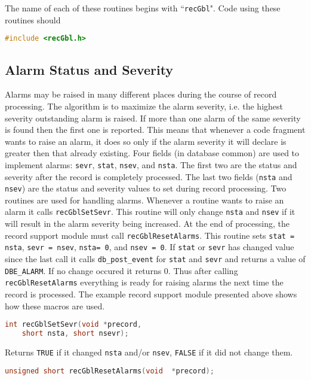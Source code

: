 The name of each of these routines begins with ``\verb|recGbl|".
Code using these routines should
\begin{lstlisting}[language=C]
#include <recGbl.h>
\end{lstlisting}

\subsection{Alarm Status and Severity}

Alarms may be raised in many different places during the course of record processing.
The algorithm is to maximize the alarm severity, i.e. the highest severity outstanding alarm is raised.
If more than one alarm of the same severity is found then the first one is reported.
This means that whenever a code fragment wants to raise an alarm, it does so only if the alarm severity it will declare is greater then that already existing.
Four fields (in database common) are used to implement alarms:
\verb|sevr|, \verb|stat|, \verb|nsev|, and \verb|nsta|.
The first two are the status and severity after the record is completely processed.
The last two fields (\verb|nsta| and \verb|nsev|) are the status and severity values to set during record processing.
Two routines are used for handling alarms.
Whenever a routine wants to raise an alarm it calls \verb|recGblSetSevr|.
This routine will only change \verb|nsta| and \verb|nsev| if it will result in the alarm severity being increased.
At the end of processing, the record support module must call \verb|recGblResetAlarms|.
This routine sets \verb|stat = nsta|, \verb|sevr = nsev|, \verb|nsta= 0|, and \verb|nsev = 0|.
If \verb|stat| or \verb|sevr| has changed value since the last call it calls \verb|db_post_event| for \verb|stat| and \verb|sevr| and returns a value of \verb|DBE_ALARM|.
If no change occured it returns 0.
Thus after calling \verb|recGblResetAlarms| everything is ready for raising alarms the next time the record is processed.
The example record support module presented above shows how these macros are used.

\begin{lstlisting}[language=C]
int recGblSetSevr(void *precord,
    short nsta, short nsevr);
\end{lstlisting}

Returns \verb|TRUE| if it changed \verb|nsta| and/or \verb|nsev|, \verb|FALSE| if it did not change them.

\begin{lstlisting}[language=C]
unsigned short recGblResetAlarms(void  *precord);
\end{lstlisting}

